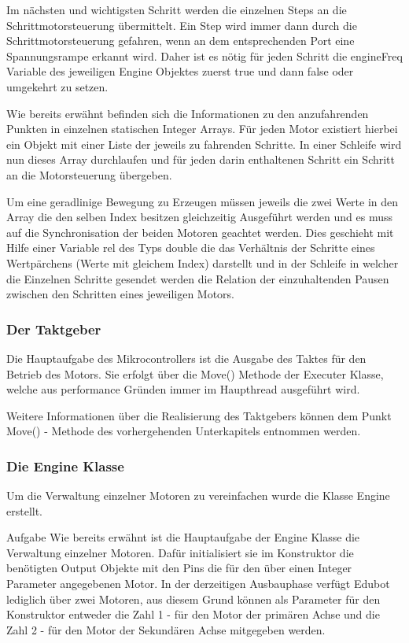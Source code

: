 \begin{itemize}
Im nächsten und wichtigsten Schritt werden die einzelnen Steps an die Schrittmotorsteuerung übermittelt. Ein Step wird immer dann durch die Schrittmotorsteuerung gefahren, wenn an dem entsprechenden Port eine Spannungsrampe erkannt wird. Daher ist es nötig für jeden Schritt die engineFreq Variable des jeweiligen Engine Objektes zuerst true und dann false oder umgekehrt zu setzen.

Wie bereits erwähnt befinden sich die Informationen zu den anzufahrenden Punkten in einzelnen statischen Integer Arrays. Für jeden Motor existiert hierbei ein Objekt mit einer Liste der jeweils zu fahrenden Schritte. In einer Schleife wird nun dieses Array durchlaufen und für jeden darin enthaltenen Schritt ein Schritt an die Motorsteuerung übergeben.

Um eine geradlinige Bewegung zu Erzeugen müssen jeweils die zwei Werte in den Array die den selben Index besitzen gleichzeitig Ausgeführt werden und es muss auf die Synchronisation der beiden Motoren geachtet werden. Dies geschieht mit Hilfe einer Variable rel des Typs double die das Verhältnis der Schritte eines Wertpärchens (Werte mit gleichem Index) darstellt und in der Schleife in welcher die Einzelnen Schritte gesendet werden die Relation der einzuhaltenden Pausen zwischen den Schritten eines jeweiligen Motors.

\end{itemize}
\subsubsection{Der Taktgeber}
Die Hauptaufgabe des Mikrocontrollers ist die Ausgabe des Taktes für den Betrieb des Motors. Sie erfolgt über die Move() Methode der Executer Klasse, welche aus performance Gründen immer im Haupthread ausgeführt wird. 

Weitere Informationen über die Realisierung des Taktgebers können dem Punkt Move() - Methode des vorhergehenden Unterkapitels entnommen werden.
\subsubsection{Die Engine Klasse}
Um die Verwaltung einzelner Motoren zu vereinfachen wurde die Klasse Engine erstellt. 

Aufgabe
Wie bereits erwähnt ist die Hauptaufgabe der Engine Klasse die Verwaltung einzelner Motoren. Dafür initialisiert sie im Konstruktor die benötigten Output Objekte mit den Pins die für den über einen Integer Parameter angegebenen Motor. In der derzeitigen Ausbauphase verfügt Edubot lediglich über zwei Motoren, aus diesem Grund können als Parameter für den Konstruktor entweder die Zahl 1 - für den Motor der primären Achse und die Zahl 2 - für den Motor der Sekundären Achse mitgegeben werden.

